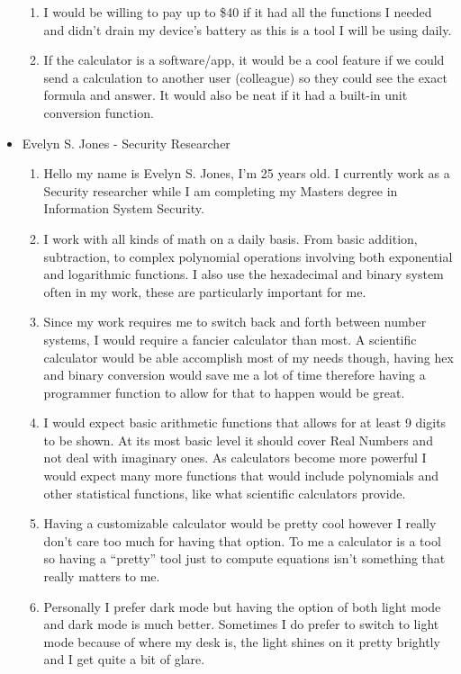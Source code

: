 \documentclass[titlepage]{article}
\begin{document}
\begin{itemize}
\begin{enumerate}
                        \item I would be willing to pay up to \$40 if it had all the functions I needed and didn’t drain my device's battery as this is a tool I will be using daily.
                        \item If the calculator is a software/app, it would be a cool feature if we could send a calculation to another user (colleague) so they could see the exact formula and answer. It would also be neat if it had a built-in unit conversion function.
                    \end{enumerate}
                \item Evelyn S. Jones - Security Researcher
                    \begin{enumerate}
                        \item Hello my name is Evelyn S. Jones, I’m 25 years old. I currently work as a Security researcher while I am completing my Masters degree in Information System Security.
                        \item I work with all kinds of math on a daily basis. From basic addition, subtraction, to complex polynomial operations involving both exponential and logarithmic functions. I also use the hexadecimal and binary system often in my work, these are particularly important for me.
                        \item Since my work requires me to switch back and forth between number systems, I would require a fancier calculator than most. A scientific calculator would be able accomplish most of my needs though, having hex and binary conversion would save me a lot of time therefore having a programmer function to allow for that to happen would be great.
                        \item I would expect basic arithmetic functions that allows for at least 9 digits to be shown. At its most basic level it should cover Real Numbers and not deal with imaginary ones. As calculators become more powerful I would expect many more functions that would include polynomials and other statistical functions, like what scientific calculators provide.
                        \item Having a customizable calculator would be pretty cool however I really don’t care too much for having that option. To me a calculator is a tool so having a “pretty” tool just to compute equations isn’t something that really matters to me.
                        \item Personally I prefer dark mode but having the option of both light mode and dark mode is much better. Sometimes I do prefer to switch to light mode because of where my desk is, the light shines on it pretty brightly and I get quite a bit of glare.

\end{enumerate}
\end{itemize}
\end{document}
